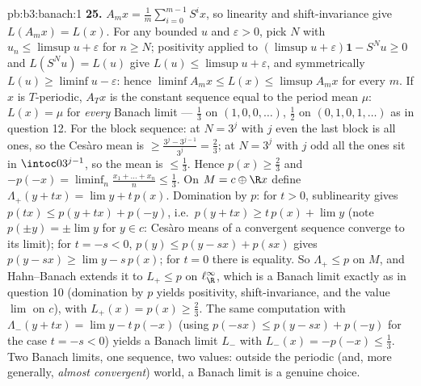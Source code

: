 \begin{solution}{pb:b3:banach:1}
\textbf{25.} $A_mx = \frac1m\sum_{i=0}^{m-1}S^ix$, so
linearity and shift-invariance give $L(A_mx) = L(x)$. For any
bounded $u$ and $\varepsilon > 0$, pick $N$ with $u_n \leq
\limsup u + \varepsilon$ for $n \geq N$; positivity applied
to $(\limsup u + \varepsilon)\mathbf 1 - S^Nu \geq 0$ and
$L(S^Nu) = L(u)$ give $L(u) \leq \limsup u + \varepsilon$,
and symmetrically $L(u) \geq \liminf u - \varepsilon$: hence
$\liminf A_mx \leq L(x) \leq \limsup A_mx$ for every $m$. If
$x$ is $T$-periodic, $A_Tx$ is the constant sequence equal to
the period mean $\mu$: $L(x) = \mu$ for \emph{every} Banach
limit --- $\frac13$ on $(1,0,0,\dots)$, $\frac12$ on
$(0,1,0,1,\dots)$ as in question 12. For the block sequence:
at $N = 3^j$ with $j$ even the last block is all ones, so the
Ces\`aro mean is $\geq \frac{3^j - 3^{j-1}}{3^j} = \frac23$;
at $N = 3^j$ with $j$ odd all the ones sit in $\intoc0
{3^{j-1}}$, so the mean is $\leq \frac13$. Hence $p(x) \geq
\frac23$ and $-p(-x) = \liminf_n\frac{x_1 + \dots + x_n}n
\leq \frac13$. On $M = c \oplus \R x$ define $\Lambda_+(y +
tx) = \lim y + t\,p(x)$. Domination by $p$: for $t > 0$,
sublinearity gives $p(tx) \leq p(y + tx) + p(-y)$, i.e.\
$p(y + tx) \geq t\,p(x) + \lim y$ (note $p(\pm y) = \pm\lim
y$ for $y \in c$: Ces\`aro means of a convergent sequence
converge to its limit); for $t = -s < 0$, $p(y) \leq p(y -
sx) + p(sx)$ gives $p(y - sx) \geq \lim y - s\,p(x)$; for $t
= 0$ there is equality. So $\Lambda_+ \leq p$ on $M$, and
Hahn--Banach extends it to $L_+ \leq p$ on $\ell^\infty_\R$,
which is a Banach limit exactly as in question 10 (domination
by $p$ yields positivity, shift-invariance, and the value
$\lim$ on $c$), with $L_+(x) = p(x) \geq \frac23$. The same
computation with $\Lambda_-(y + tx) = \lim y - t\,p(-x)$
(using $p(-sx) \leq p(y - sx) + p(-y)$ for the case $t = -s
< 0$) yields a Banach limit $L_-$ with $L_-(x) = -p(-x) \leq
\frac13$. Two Banach limits, one sequence, two values:
outside the periodic (and, more generally, \emph{almost
convergent}) world, a Banach limit is a genuine choice.
\end{solution}
